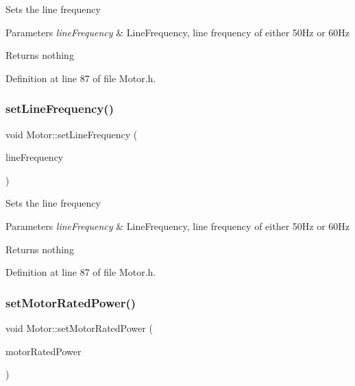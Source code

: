 Sets the line frequency


\begin{DoxyParams}{Parameters}
{\em line\+Frequency} & Line\+Frequency, line frequency of either 50\+Hz or 60\+Hz\\
\hline
\end{DoxyParams}
\begin{DoxyReturn}{Returns}
nothing 
\end{DoxyReturn}


Definition at line 87 of file Motor.\+h.

\mbox{\label{class_motor_a450e5ecea25b05413b731379f153c3f1}} 
\subsubsection{\texorpdfstring{set\+Line\+Frequency()}{setLineFrequency()}\hspace{0.1cm}{\footnotesize\ttfamily [3/3]}}
{\footnotesize\ttfamily void Motor\+::set\+Line\+Frequency (\begin{DoxyParamCaption}\item[{\hyperlink{class_motor_acee1bdf1b684ad36cb80dc2829d9fcee}{Line\+Frequency}}]{line\+Frequency }\end{DoxyParamCaption})\hspace{0.3cm}{\ttfamily [inline]}}

Sets the line frequency


\begin{DoxyParams}{Parameters}
{\em line\+Frequency} & Line\+Frequency, line frequency of either 50\+Hz or 60\+Hz\\
\hline
\end{DoxyParams}
\begin{DoxyReturn}{Returns}
nothing 
\end{DoxyReturn}


Definition at line 87 of file Motor.\+h.

\mbox{\label{class_motor_aa01f82db13c71b045b05e49f42ba46e9}} 
\subsubsection{\texorpdfstring{set\+Motor\+Rated\+Power()}{setMotorRatedPower()}\hspace{0.1cm}{\footnotesize\ttfamily [1/3]}}
{\footnotesize\ttfamily void Motor\+::set\+Motor\+Rated\+Power (\begin{DoxyParamCaption}\item[{double}]{motor\+Rated\+Power }\end{DoxyParamCaption})\hspace{0.3cm}{\ttfamily [inline]}}

